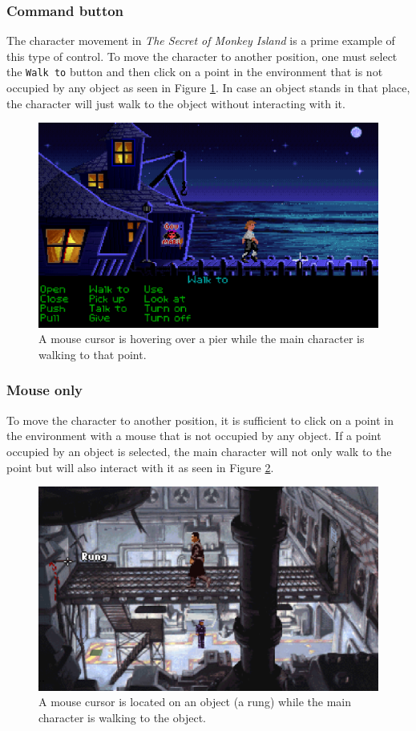 \subsubsection{Command button}
The character movement in \textit{The Secret of Monkey Island} is a prime example of this type of control. To move the character to another position, one must select the \texttt{Walk to} button and then click on a point in the environment that is not occupied by any object as seen in Figure \ref{fig:M-TSoMI}. In case an object stands in that place, the character will just walk to the object without interacting with it.

\begin{figure}[H]
\centering
\includegraphics[width=.8\linewidth]{img/W-TSoMI.png}
\caption{A mouse cursor is hovering over a pier while the main character is walking to that point.}
\label{fig:M-TSoMI}
\end{figure}

\subsubsection{Mouse only}
To move the character to another position, it is sufficient to click on a point in the environment with a mouse that is not occupied by any object. If a point occupied by an object is selected, the main character will not only walk to the point but will also interact with it as seen in Figure \ref{fig:M-BaSS}.

\begin{figure}[H]
\centering
\includegraphics[width=.8\linewidth]{img/M-BaSS.png}
\caption{A mouse cursor is located on an object (a rung) while the main character is walking to the object.}
\label{fig:M-BaSS}
\end{figure}

